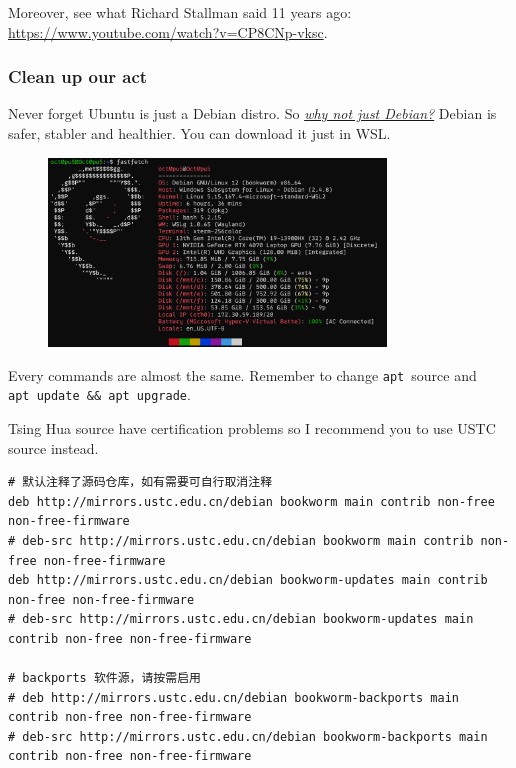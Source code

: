 \documentclass[12pt]{ctexart}
\newenvironment{mdquote}
{%
  \par\noindent
  \begin{list}{}{%
      \setlength{\leftmargin}{1em}%
      \setlength{\rightmargin}{0pt}%
      \setlength{\itemindent}{0pt}%
      \setlength{\listparindent}{\parindent}%
      \setlength{\topsep}{0.5\baselineskip}%
  }
  \item[\textbf{>}\ ]\itshape
}
{\end{list}\par}
\begin{document}
Moreover, see what Richard Stallman said 11 years ago:
\url{https://www.youtube.com/watch?v=CP8CNp-vksc}.

\subsubsection{\textbf{Clean up our act}}

Never forget Ubuntu is just a Debian distro. So
\href{https://www.debian.org/intro/why_debian}{\textit{why not just
Debian?}} Debian is safer, stabler and healthier. You can download it
just in WSL.

\begin{figure}[H]
    \centering
    \includegraphics[width=0.8\textwidth,keepaspectratio]{assets/Linux/2.7 I'd rather be a bookworm/2.png}
\end{figure}

Every commands are almost the same. Remember to change \texttt{apt}\
source and \texttt{apt\ update\ \&\&\ apt\ upgrade}.

\begin{mdquote}
Tsing Hua source have certification problems so I recommend you to use
USTC source instead.
\end{mdquote}

\fontsize{7}{9}
\begin{adjustwidth}{2em}{0pt}
\begin{verbatim}
# 默认注释了源码仓库，如有需要可自行取消注释
deb http://mirrors.ustc.edu.cn/debian bookworm main contrib non-free non-free-firmware
# deb-src http://mirrors.ustc.edu.cn/debian bookworm main contrib non-free non-free-firmware
deb http://mirrors.ustc.edu.cn/debian bookworm-updates main contrib non-free non-free-firmware
# deb-src http://mirrors.ustc.edu.cn/debian bookworm-updates main contrib non-free non-free-firmware

# backports 软件源，请按需启用
# deb http://mirrors.ustc.edu.cn/debian bookworm-backports main contrib non-free non-free-firmware
# deb-src http://mirrors.ustc.edu.cn/debian bookworm-backports main contrib non-free non-free-firmware
\end{verbatim}
\end{adjustwidth}
\end{document}
